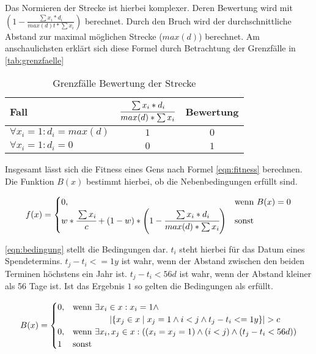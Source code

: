 Das Normieren der Strecke ist hierbei komplexer.
Deren Bewertung wird mit $(1 - \frac{\sum x_i * d_i}{max(d)t* \sum x_i})$ berechnet.
Durch den Bruch wird der durchschnittliche Abstand zur maximal möglichen Strecke ($max(d)$) berechnet.
Am anschaulichsten erklärt sich diese Formel durch Betrachtung der Grenzfälle in \autoref{tab:grenzfaelle}
\begin{table}[ht]%
    \begin{center}
        \begin{tabular}{l|c|c}
            Fall                            & $\cfrac{\sum x_i * d_i}{max(d) * \sum x_i}$  &  Bewertung \\
            \hline
            $\forall x_i = 1: d_i = max(d)$ & $1$                                           & $0$       \\
            $\forall x_i = 1: d_i = 0$      & $0$                                           & $1$       \\
        \end{tabular}
    \end{center}
    \caption{Grenzfälle Bewertung der Strecke}
    \label{tab:grenzfaelle}
  \end{table}

Insgesamt lässt sich die Fitness eines Gens nach Formel \ref{eqn:fitness} berechnen.
Die Funktion $B(x)$ bestimmt hierbei, ob die Nebenbedingungen erfüllt sind.

\begin{equation}
    \label{eqn:fitness}
    f(x)=
    \begin{cases}
        0,              & \text{wenn } B(x) = 0 \\
        w * \cfrac{\sum x_i}{c} + (1 - w) * \left(1 - \cfrac{\sum x_i * d_i}{max(d) * \sum x_i}\right) & \text{sonst}
    \end{cases}
\end{equation}

\ref{eqn:bedingung} stellt die Bedingungen dar.
$t_i$ steht hierbei für das Datum eines Spendetermins.
$t_j - t_i <= 1y$ ist wahr, wenn der Abstand zwischen den beiden Terminen höchstens ein Jahr ist.
$t_j - t_i < 56d$ ist wahr, wenn der Abstand kleiner als 56 Tage ist.
Ist das Ergebnis $1$ so gelten die Bedingungen als erfüllt.



\begin{multline}
    \label{eqn:bedingung}
    B(x)=
    \begin{cases}
        0, & \text{wenn } \exists x_i \in x : x_i = 1  \wedge \\
           & \hspace{10ex} \lvert \{ x_j\in x \mid x_j = 1 \wedge i < j \wedge t_j - t_i <= 1y  \} \rvert > c   \\
        0, & \text{wenn } \exists x_i, x_j \in x : \left( (x_i = x_j = 1) \wedge (i < j) \wedge (t_j - t_i < 56d) \right)    \\
        1  & \text{sonst}
    \end{cases}
\end{multline}

